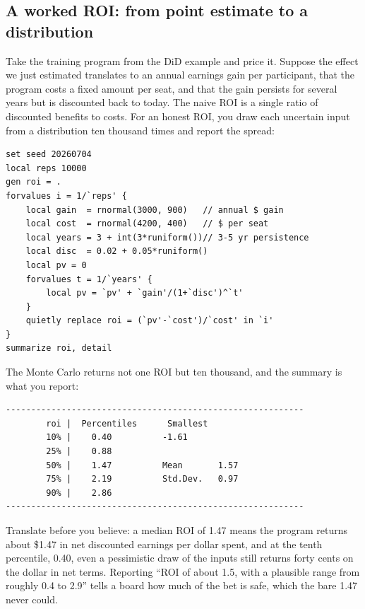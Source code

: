 \documentclass[
    a4paper,
    fontsize=10pt,
    twoside=true,
    numbers=noenddot,
]{kaobook}
\begin{document}
\subsection{A worked ROI: from point estimate to a distribution}
Take the training program from the DiD example and price it. Suppose the effect we just estimated translates to an annual earnings gain per participant, that the program costs a fixed amount per seat, and that the gain persists for several years but is discounted back to today. The naive ROI is a single ratio of discounted benefits to costs. For an honest ROI, you draw each uncertain input from a distribution ten thousand times and report the spread:
\par
{\footnotesize
\begin{verbatim}
set seed 20260704
local reps 10000
gen roi = .
forvalues i = 1/`reps' {
    local gain  = rnormal(3000, 900)   // annual $ gain
    local cost  = rnormal(4200, 400)   // $ per seat
    local years = 3 + int(3*runiform())// 3-5 yr persistence
    local disc  = 0.02 + 0.05*runiform()
    local pv = 0
    forvalues t = 1/`years' {
        local pv = `pv' + `gain'/(1+`disc')^`t'
    }
    quietly replace roi = (`pv'-`cost')/`cost' in `i'
}
summarize roi, detail
\end{verbatim}
}
The Monte Carlo returns not one ROI but ten thousand, and the summary is what you report:
\par
{\footnotesize
\begin{verbatim}
-----------------------------------------------------------
        roi |  Percentiles      Smallest
        10% |    0.40          -1.61
        25% |    0.88
        50% |    1.47          Mean       1.57
        75% |    2.19          Std.Dev.   0.97
        90% |    2.86
-----------------------------------------------------------
\end{verbatim}
}
Translate before you believe: a median ROI of 1.47 means the program returns about \$1.47 in net discounted earnings per dollar spent, and at the tenth percentile, 0.40, even a pessimistic draw of the inputs still returns forty cents on the dollar in net terms. Reporting \enquote{ROI of about 1.5, with a plausible range from roughly 0.4 to 2.9} tells a board how much of the bet is safe, which the bare 1.47 never could.
\end{document}

